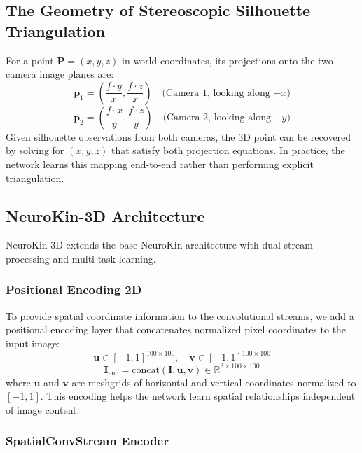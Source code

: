 \documentclass[12pt,a4paper,oneside]{report}
\begin{document}
\subsection{The Geometry of Stereoscopic Silhouette Triangulation}

For a point $\mathbf{P} = (x, y, z)$ in world coordinates, its projections onto the two camera image planes are:
\begin{equation}
\mathbf{p}_1 = \left( \frac{f \cdot y}{x}, \frac{f \cdot z}{x} \right) \quad \text{(Camera 1, looking along $-x$)}
\end{equation}
\begin{equation}
\mathbf{p}_2 = \left( \frac{f \cdot x}{y}, \frac{f \cdot z}{y} \right) \quad \text{(Camera 2, looking along $-y$)}
\end{equation}
Given silhouette observations from both cameras, the 3D point can be recovered by solving for $(x, y, z)$ that satisfy both projection equations. In practice, the network learns this mapping end-to-end rather than performing explicit triangulation.

\subsection{NeuroKin-3D Architecture}

NeuroKin-3D extends the base NeuroKin architecture with dual-stream processing and multi-task learning.

\subsubsection{Positional Encoding 2D}

To provide spatial coordinate information to the convolutional streams, we add a positional encoding layer that concatenates normalized pixel coordinates to the input image:
\begin{equation}
\mathbf{u} \in [-1, 1]^{100 \times 100}, \quad \mathbf{v} \in [-1, 1]^{100 \times 100}
\end{equation}
\begin{equation}
\mathbf{I}_{\text{enc}} = \text{concat}(\mathbf{I}, \mathbf{u}, \mathbf{v}) \in \mathbb{R}^{3 \times 100 \times 100}
\end{equation}
where $\mathbf{u}$ and $\mathbf{v}$ are meshgrids of horizontal and vertical coordinates normalized to $[-1, 1]$. This encoding helps the network learn spatial relationships independent of image content.

\subsubsection{SpatialConvStream Encoder}
\end{document}

